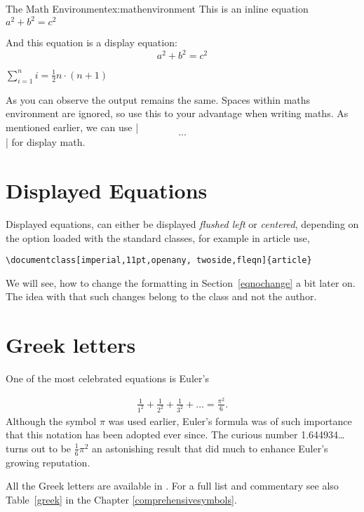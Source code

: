 {\begin{texexample}{The Math Environment}{ex:mathenvironment}
 This is an inline equation \(a^2+b^2=c^2\)

 And this equation is a display equation:
 \[a^2+b^2=c^2\]

 \begin{math}
 \sum_{i=1}^{n}i=\frac{1}{2}n\cdot(n+1)
 \end{math}
\end{texexample}

As you can observe the output remains the same.  Spaces within  maths environment are ignored, so use this to your advantage when writing maths. As mentioned earlier, we can use |\[...\]| for display math.


\section{Displayed Equations}


Displayed equations, can either be displayed \emph{flushed left} or \emph{centered}, depending on the option loaded with the standard classes, for example in article use,

\begin{verbatim}
\documentclass[imperial,11pt,openany, twoside,fleqn]{article}
\end{verbatim}

We will see, how to change the formatting in Section~\ref{eqnochange} a bit later on. The idea with \latex that such changes belong to the class and not the author.

\section{Greek letters}

One of the most celebrated equations is Euler's 

\begin{gather}
\frac{1}{1^2} + \frac{1}{2^2} + \frac{1}{3^2} +\dots=\frac{\pi^2}{6}.
\end{gather}
Although the symbol $\pi$ was used earlier, Euler's formula was of such importance that this notation has been adopted ever since. The curious number 1.644934\ldots turns out to be $\tfrac{1}{6}\pi^2$ an astonishing result that did much to enhance Euler's growing reputation.


All the Greek letters are available in \tex{}. For a full list and commentary
see also Table~\vref{greek} in the Chapter \vref{comprehensivesymbols}. 

}
